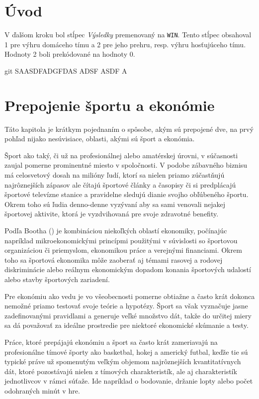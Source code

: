 \documentclass[
  digital, %
  oneside, %
  notable,   %
  lof,     %
  lot,     %
]{fithesis3}
\begin{document}
	\makeatletter
	\thesis@preamble %
	\makeatother
	
	\chapter*{Úvod}
	
	V ďalšom kroku bol stĺpec \textit{Výsledky} premenovaný na 	\texttt{WIN}. Tento stĺpec obsahoval 1 pre výhru domáceho tímu a 2 pre jeho prehru, resp. výhru hosťujúceho tímu. Hodnoty 2 boli prekódované na hodnoty 0. \parencite{merritt2014}
	
git 	SAASDFADGFDAS ADSF ASDF A \parencite{berger2011}

	\chapter{Prepojenie športu a ekonómie}
	Táto kapitola je krátkym pojednaním o spôsobe, akým sú prepojené dve, na prvý pohľad nijako nesúvisiace, oblasti, akými sú šport a ekonómia.
	
	Šport ako taký, či už na profesionálnej alebo amatérskej úrovni, v súčasnosti zaujal pomerne prominentné miesto v spoločnosti. V podobe zábavného biznisu má celosvetový dosah na milióny ľudí, ktorí sa nielen priamo zúčastňujú najrôznejších zápasov ale čítajú športové články a časopisy či si predplácajú športové televízne stanice a pravidelne sledujú dianie svojho obľúbeného športu. \parencite{conrad2011} Okrem toho sú ľudia denno-denne vyzývaní aby sa sami venovali nejakej športovej aktivite, ktorá je vyzdvihovaná pre svoje zdravotné benefity.
	
	Podľa Bootha (\citeyear{booth2009}) je kombináciou niekoľkých oblastí ekonomiky, počínajúc napríklad mikroekonomickými princípmi použitými v súvislosti so športovou organizáciou či priemyslom, ekonomikou práce a verejnými financiami. Okrem toho sa športová ekonomika môže zaoberať aj témami rasovej a rodovej diskriminácie alebo reálnym ekonomickým dopadom konania športových udalostí alebo stavby športových zariadení. 
	
	Pre ekonómiu ako vedu je vo všeobecnosti pomerne obtiažne a často krát dokonca nemožné  priamo testovať svoje teórie a hypotézy. Šport sa však vyznačuje jasne zadefinovanými pravidlami a generuje veľké množstvo dát, takže do určitej miery sa dá považovať za ideálne prostredie pre niektoré ekonomické skúmanie a testy.
	
	Práce, ktoré prepájajú ekonómiu a šport sa často krát zameriavajú na profesionálne tímové športy ako basketbal, hokej a americký futbal, keďže tie sú typické práve už spomenutým veľkým objemom najrôznejších kvantitatívnych dát, ktoré pozostávajú nielen z tímových charakteristík, ale aj charakteristík jednotlivcov v rámci súťaže. Ide napríklad o bodovanie, držanie lopty alebo počet odohraných minút v hre.
	
\end{document}
